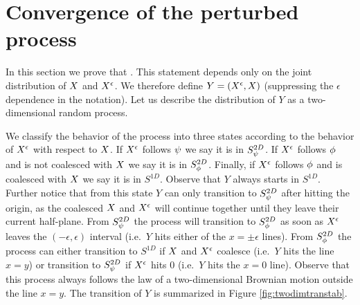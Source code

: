 {
\section{Convergence of the perturbed process}
\label{sec:proof-of-lem:resamplede-to-sampled}

\newcommand{\statenoweb}{S^{2D}_{\indepbm}}
\newcommand{\statewebapart}{S^{2D}_{\webnoargs}}
\newcommand{\statewebtogether}{S^{1D}}
\newcommand{\twodim}{Y}

In this section we prove that
\statementoflemresampledetosampled{}.  This statement depends only on the
joint distribution of $X$ and $X^{\epsilon}$.
We therefore define $\twodim=(\resamplede, \sampled)$ (suppressing
the $\epsilon$ dependence in the notation). Let us describe the distribution of
$\twodim$
 as a two-dimensional random process.

We classify the behavior of the process into three states according to
the behavior of $X^{\epsilon}$ with respect to $X$. If $X^{\epsilon}$ follows
$\psi$ we say it is in $\statenoweb$. If $X^{\epsilon}$ follows $\phi$
and is not coalesced with $X$ we say it is in $\statewebapart$. Finally,
if $X^{\epsilon}$ follows $\phi$ and is coalesced with $X$ we say it is in
$\statewebtogether$. Observe that $\twodim$ always starts
in $\statewebtogether$. Further notice that from this state $\twodim$
can only transition to $\statenoweb$ after hitting the origin, as the coalesced
$X$ and $X^{\epsilon}$ will continue together until they leave their
current half-plane. From $\statenoweb$ the process will transition to
$\statewebapart$ as soon as $X^{\epsilon}$ leaves the $(-\epsilon,\epsilon)$
interval (i.e.\ $\twodim$ hits either of the $x=\pm\epsilon$ lines). From
$\statewebapart$ the process can either transition to $\statewebtogether$
if $X$ and $X^{\epsilon}$ coalesce (i.e.\ $\twodim$ hits the line $x=y$)
or transition to $\statenoweb$ if $X^{\epsilon}$ hits $0$ (i.e.\ $\twodim$ hits
the $x=0$ line). Observe that this process always follows the law of a two-dimensional
Brownian motion outside the line $x = y$. The transition of $\twodim$ is
summarized in Figure
\ref{fig:twodimtranstab}.

}
